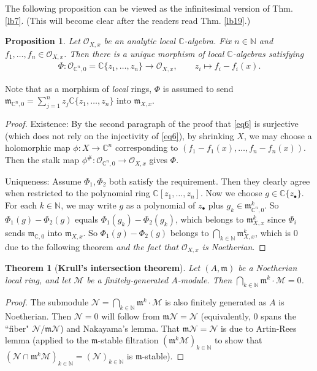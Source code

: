 \documentclass[12pt,b5paper,notitlepage]{report}
\theoremstyle{definition}
\theoremstyle{plain}
\newtheorem{thm}[df]{Theorem}
\newtheorem{pp}[df]{Proposition}
\newcommand{\fk}{\mathfrak}
\newcommand{\mc}{\mathcal}
\newcommand{\scr}{\mathscr}
\newcommand{\blt}{\bullet}
\newcommand{\Cbb}{\mathbb C}
\newcommand{\Nbb}{\mathbb N}
\numberwithin{equation}{section}
\begin{document}
The following proposition can be viewed as the infinitesimal version of Thm. \ref{lb7}. (This will become clear after the readers read Thm. \ref{lb19}.)

\begin{pp}\label{lb8}
Let $\scr O_{X,x}$ be an analytic local $\Cbb$-algebra. Fix $n\in\Nbb$ and $f_1,\dots,f_n\in\scr O_{X,x}$. Then there is a unique morphism of local $\Cbb$-algebras satisfying
\begin{align}
\Phi:\scr O_{\Cbb^n,0}=\Cbb\{z_1,\dots,z_n\}\rightarrow \scr O_{X,x},\qquad z_i\mapsto f_i-f_i(x).
\end{align}
\end{pp}

Note that as a morphism of \textit{local} rings, $\Phi$ is assumed to send $\fk m_{\Cbb^n,0}=\sum_{j=1}^n z_j\Cbb\{z_1,\dots,z_n\}$ into $\fk m_{X,x}$.



\begin{proof}
Existence: By the second paragraph of the proof that \eqref{eq6} is surjective (which does not rely on the injectivity of \eqref{eq6}), by shrinking $X$, we may choose a holomorphic map $\phi:X\rightarrow\Cbb^n$ corresponding to $(f_1-f_1(x),\dots,f_n-f_n(x))$. Then the stalk map $\phi^\#:\scr O_{\Cbb^n,0}\rightarrow\scr O_{X,x}$ gives $\Phi$.

Uniqueness: Assume $\Phi_1,\Phi_2$ both satisfy the requirement. Then they clearly agree when restricted to the polynomial ring $\Cbb[z_1,\dots,z_n]$. Now we choose $g\in\Cbb\{z_\blt\}$. For each $k\in\Nbb$, we may write $g$ as a polynomial of $z_\blt$ plus $g_k\in\fk m_{\Cbb^n,0}^k$. So $\Phi_1(g)-\Phi_2(g)$ equals $\Phi_1(g_k)-\Phi_2(g_k)$, which belongs to $\fk m_{X,x}^k$ since  $\Phi_i$  sends $\fk m_{\Cbb,0}$ into $\fk m_{X,x}$. So $\Phi_1(g)-\Phi_2(g)$ belongs to $\bigcap_{k\in\Nbb}\fk m_{X,x}^k$, which is $0$ due to the following theorem \textit{and the fact that $\scr O_{X,x}$ is Noetherian}.
\end{proof}



\begin{thm}[\textbf{Krull's intersection theorem}]\label{lb162} 
Let $(A,\fk m)$ be a Noetherian local ring, and let $\mc M$ be a finitely-generated $A$-module. Then $\bigcap_{k\in\Nbb}\fk m^k\cdot \mc M=0$.
\end{thm}

\begin{proof}
The submodule $\mc N=\bigcap_{k\in\Nbb}\fk m^k\cdot \mc M$ is also finitely generated as $A$ is Noetherian. Then $\mc N=0$ will follow from $\fk m\mc N=\mc N$ (equivalently, $0$ spans the ``fiber" $\mc N/\fk m\mc N$) and  Nakayama's lemma. That  $\fk m\mc N=\mc N$ is due to Artin-Rees lemma (applied to the $\fk m$-stable filtration $(\fk m^k\mc M)_{k\in\Nbb}$ to show that $(\mc N\cap\fk m^k\mc M)_{k\in\Nbb}=(\mc N)_{k\in\Nbb}$ is $\fk m$-stable).
\end{proof}
\end{document}
